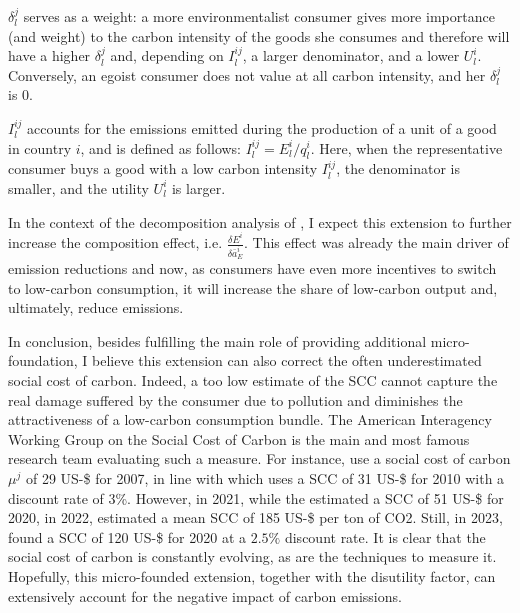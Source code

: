 $\delta_l^j$ serves as a weight: a more environmentalist consumer gives more importance (and weight) to the carbon intensity of the goods she consumes and therefore will have a higher $\delta_l^j$ and, depending on $I_l^{ij}$, a larger denominator, and a lower $U_l^i$. Conversely, an egoist consumer does not value at all carbon intensity, and her $\delta_l^j$ is 0.

$I_l^{ij}$ accounts for the emissions emitted during the production of a unit of a good in country $i$, and is defined as follows: $I_l^{ij}=E_l^i/q_l^i$. Here, when the representative consumer buys a good with a low carbon intensity $I_l^{ij}$, the denominator is smaller, and the utility $U_l^i$ is larger.

In the context of the decomposition analysis of \textcite{Larch2017}, I expect this extension to further increase the composition effect, i.e. $\frac{\delta E^i}{\delta \bar{a}^i_E}$. This effect was already the main driver of emission reductions and now, as consumers have even more incentives to switch to low-carbon consumption, it will increase the share of low-carbon output and, ultimately, reduce emissions. 

In conclusion, besides fulfilling the main role of providing additional micro-foundation, I believe this extension can also correct the often underestimated social cost of carbon. Indeed, a too low estimate of the SCC cannot capture the real damage suffered by the consumer due to pollution and diminishes the attractiveness of a low-carbon consumption bundle. The American Interagency Working Group on the Social Cost of Carbon is the main and most famous research team evaluating such a measure. For instance, \textcite{Larch2017} use a social cost of carbon $\mu^j$ of 29 US-\$ for 2007, in line with \textcite{Nordhaus2017} which uses a SCC of 31 US-\$ for 2010 with a discount rate of 3\%. However, in 2021, while the \textcite{SCC2021} estimated a SCC of 51 US-\$ for 2020, in 2022, \textcite{Rennert2022} estimated a mean SCC of 185 US-\$ per ton of CO2. Still, in 2023, \textcite{SCC2023} found a SCC of 120 US-\$  for 2020 at a $2.5\%$ discount rate. It is clear that the social cost of carbon is constantly evolving, as are the techniques to measure it. Hopefully, this micro-founded extension, together with the disutility factor, can extensively account for the negative impact of carbon emissions.